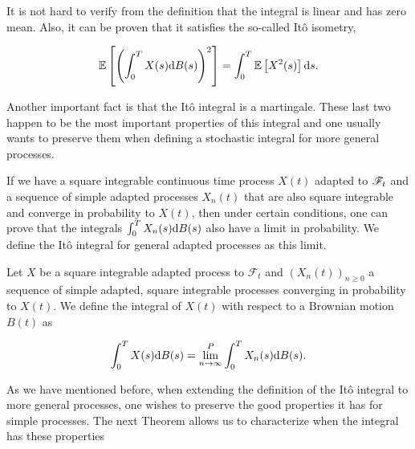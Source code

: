 It is not hard to verify from the definition that the integral is linear and has zero mean. Also, it can be proven that it satisfies the so-called Itô isometry,

\begin{equation*}
    \mathbb E \left[  \left( \int_0^T X(s) \mathrm d B(s)\right)^2  \right] = \int_0^T \mathbb E \left[ X^2(s) \right] \mathrm d s.
\end{equation*}

Another important fact is that the Itô integral is a martingale. These last two happen to be the most important properties of this integral and one usually wants to preserve them when defining a stochastic integral for more general processes. 

If we have a square integrable continuous time process $X(t)$ adapted to $\mathscr F_t$ and a sequence of simple adapted processes $X_n(t)$ that are also square integrable and converge in probability to $X(t)$, then under certain conditions, one can prove that the integrals $\int_0^T X_n(s)\mathrm d B(s)$ also have a limit in probability. We define the Itô integral for general adapted processes as this limit.

\begin{definition}
    Let $X$ be a square integrable adapted process to $\mathscr F_t$ and $(X_n(t))_{n\ge 0}$ a sequence of simple adapted, square integrable processes converging in probability to $X(t)$. We define the integral of $X(t)$ with respect to a Brownian motion $B(t)$ as

    \begin{equation*}
        \int_0^T X(s) \mathrm d B(s) = \lim_{n\to\infty}^P \int_0^T X_n(s) \mathrm d B(s).
    \end{equation*}
\end{definition}

As we have mentioned before, when extending the definition of the Itô integral to more general processes, one wishes to preserve the good properties it has for simple processes. The next Theorem allows us to characterize when the integral has these properties

